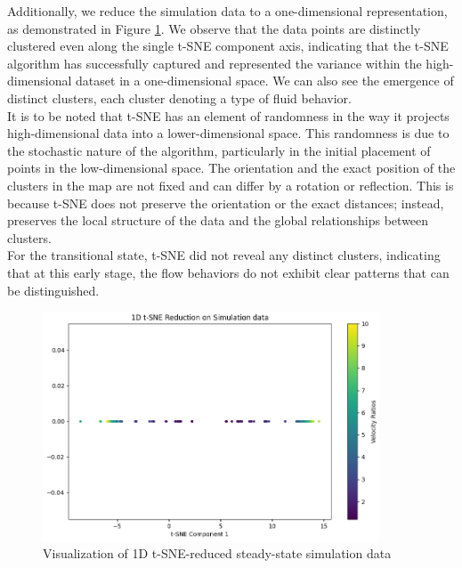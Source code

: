 Additionally, we reduce the simulation data to a one-dimensional representation, as demonstrated in Figure \ref{1dtsne}. We observe that the data points are distinctly clustered even along the single t-SNE component axis, indicating that the t-SNE algorithm has successfully captured and represented the variance within the high-dimensional dataset in a one-dimensional space. We can also see the emergence of distinct clusters, each cluster denoting a type of fluid behavior. \\
It is to be noted that t-SNE has an element of randomness in the way it projects high-dimensional data into a lower-dimensional space. This randomness is due to the stochastic nature of the algorithm, particularly in the initial placement of points in the low-dimensional space. The orientation and the exact position of the clusters in the map are not fixed and can differ by a rotation or reflection. This is because t-SNE does not preserve the orientation or the exact distances; instead, preserves the local structure of the data and the global relationships between clusters. \\
For the transitional state, t-SNE did not reveal any distinct clusters, indicating that at this early stage, the flow behaviors do not exhibit clear patterns that can be distinguished. 
\begin{figure}[ht]
    \centering
    \includegraphics[width=10cm]{images/Clustering/tsne_sim_1dcmap.png}
    \caption{Visualization of 1D t-SNE-reduced steady-state simulation data}
    \label{1dtsne}
    \end{figure}


